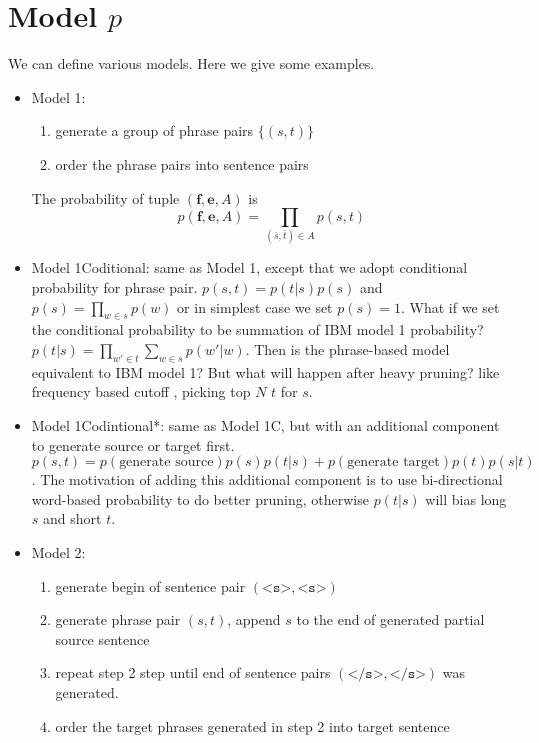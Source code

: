 \documentclass[11pt, letterpaper]{article}   	%
\begin{document}
\section{Model $p$} 
We can define various models. Here we give some examples.
\begin{itemize}

\item Model 1:
\begin{enumerate}
\item generate a group of phrase pairs $\{(s,t)\}$
\item order the phrase pairs into sentence pairs
\end{enumerate}

The probability of tuple $(\textbf{f},\textbf{e},A)$ is 
\begin{equation} \label{eq:obj1}
p(\textbf{f},\textbf{e},A)=\prod_{(\bar{s},\bar{t})\in A}p(s,t)
\end{equation}

\item Model 1Coditional:
same as Model 1, except that we adopt conditional probability for phrase pair. $p(s,t)=p(t|s)p(s)$ and $p(s)=\prod_{w\in s} p(w)$ or in simplest case we set $p(s)=1$. What if we set the conditional probability to be summation of IBM model 1 probability? $p(t|s)=\prod_{w' \in t} \sum_{w\in s} p(w'|w)$. Then is the phrase-based model equivalent to IBM model 1? But what will happen after heavy pruning? like frequency based cutoff \cite{marcu-wong-02}, picking top $N$ $t$ for $s$.

\item Model 1Codintional*:
same as Model 1C, but with an additional component to generate source or target first. 
\begin{equation}
p(s,t)=p(\text{generate source})p(s)p(t|s)+p(\text{generate target})p(t)p(s|t)
\end{equation}. The motivation of adding this additional component is to use bi-directional word-based probability to do better pruning, otherwise $p(t|s)$ will bias long $s$ and short $t$.

\item Model 2:

\begin{enumerate}
\item generate begin of sentence pair $(\texttt{<s>},\texttt{<s>})$
\item generate phrase pair $(s,t)$, append $s$ to the end of generated partial source sentence
\item repeat step 2 step until end of sentence pairs $(\texttt{</s>},\texttt{</s>})$ was generated.
\item order the target phrases generated in step 2 into target sentence
\end{enumerate}


\end{itemize}
\end{document}
